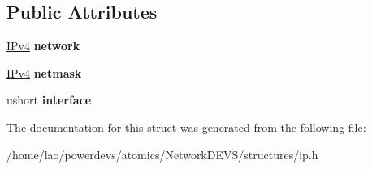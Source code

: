\subsection*{Public Attributes}
\begin{DoxyCompactItemize}
\item 
\hyperlink{structIPv4}{I\+Pv4} {\bfseries network}\hypertarget{structip_1_1Forwarding__entry_aec0c736499656bd68f001cc50b6b4017}{}\label{structip_1_1Forwarding__entry_aec0c736499656bd68f001cc50b6b4017}

\item 
\hyperlink{structIPv4}{I\+Pv4} {\bfseries netmask}\hypertarget{structip_1_1Forwarding__entry_a51b8230ced4d6e7ea1e17f357bea242a}{}\label{structip_1_1Forwarding__entry_a51b8230ced4d6e7ea1e17f357bea242a}

\item 
ushort {\bfseries interface}\hypertarget{structip_1_1Forwarding__entry_aa84edda440aa39d70142b02320be2e07}{}\label{structip_1_1Forwarding__entry_aa84edda440aa39d70142b02320be2e07}

\end{DoxyCompactItemize}


The documentation for this struct was generated from the following file\+:\begin{DoxyCompactItemize}
\item 
/home/lao/powerdevs/atomics/\+Network\+D\+E\+V\+S/structures/ip.\+h\end{DoxyCompactItemize}
